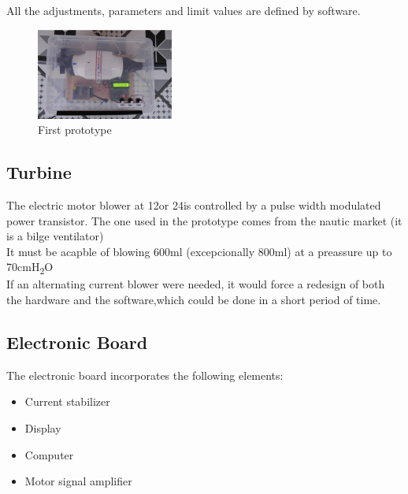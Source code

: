     All the adjustments, parameters and limit values are defined by software.
    \begin{figure}
        \centering
        \includegraphics[width=0.4\textwidth]{Img/prototipo-1.PNG}
        \caption{First prototype}
    \end{figure}
    
\subsection{Turbine}
    The electric motor blower at 12\Vcc or 24\Vcc is controlled by a pulse width modulated power transistor. The one used in the prototype comes from the nautic market (it is a bilge ventilator)\\    
    It must be acapble of blowing 600ml (excepcionally 800ml) at a preassure up to 70cmH\textsubscript{2}O\\
    If an alternating current blower were needed, it would force a redesign of both the hardware and the software,which could be done in a short period of time.

\subsection{Electronic Board}
    The electronic board incorporates the following elements:
    \begin{itemize}
        \item Current stabilizer  %
        \item Display %
        \item Computer %
        \item Motor signal amplifier  %
    \end{itemize}
    
